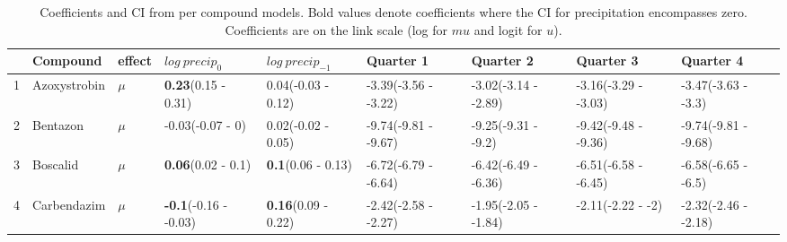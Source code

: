 \begingroup\fontsize{8pt}{10pt}\selectfont
\begin{longtable}{lp{2cm}p{0.6cm}p{1.8cm}p{1.8cm}p{1.8cm}p{1.8cm}p{1.8cm}p{1.8cm}}
\caption{Coefficients and CI from per compound models. 
                     Bold values denote coefficients where the CI for precipitation encompasses zero.
                     Coefficients are on the link scale (log for $mu$ and logit for $
u$).} \\ 
  \toprule
 & Compound & effect & $log~precip_0$ & $log~precip_{-1}$ & Quarter 1 & Quarter 2 & Quarter 3 & Quarter 4 \\ 
  \midrule
1 & Azoxystrobin & $\mu$ & \textbf{0.23}\newline (0.15 - 0.31) & 0.04\newline (-0.03 - 0.12) & -3.39\newline (-3.56 - -3.22) & -3.02\newline (-3.14 - -2.89) & -3.16\newline (-3.29 - -3.03) & -3.47\newline (-3.63 - -3.3) \\ 
  2 & Bentazon & $\mu$ & -0.03\newline (-0.07 - 0) & 0.02\newline (-0.02 - 0.05) & -9.74\newline (-9.81 - -9.67) & -9.25\newline (-9.31 - -9.2) & -9.42\newline (-9.48 - -9.36) & -9.74\newline (-9.81 - -9.68) \\ 
  3 & Boscalid & $\mu$ & \textbf{0.06}\newline (0.02 - 0.1) & \textbf{0.1}\newline (0.06 - 0.13) & -6.72\newline (-6.79 - -6.64) & -6.42\newline (-6.49 - -6.36) & -6.51\newline (-6.58 - -6.45) & -6.58\newline (-6.65 - -6.5) \\ 
  4 & Carbendazim & $\mu$ & \textbf{-0.1}\newline (-0.16 - -0.03) & \textbf{0.16}\newline (0.09 - 0.22) & -2.42\newline (-2.58 - -2.27) & -1.95\newline (-2.05 - -1.84) & -2.11\newline (-2.22 - -2) & -2.32\newline (-2.46 - -2.18) \\ 

\end{longtable}
